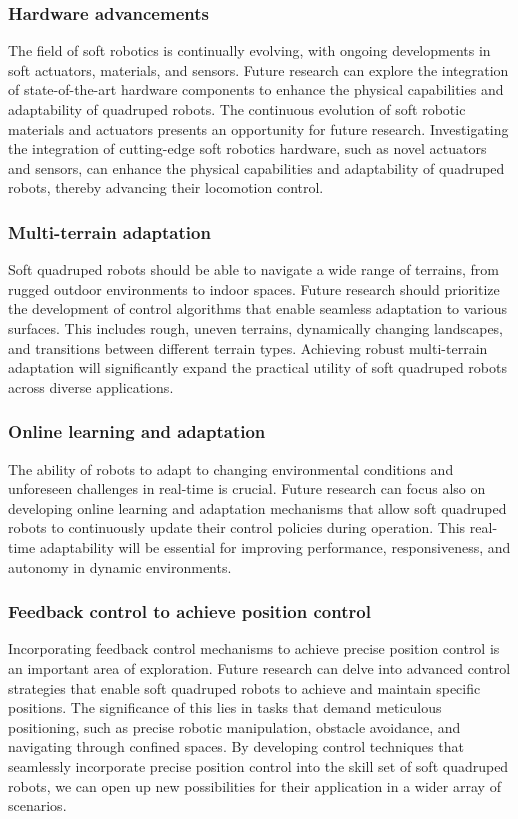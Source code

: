 \subsubsection*{Hardware advancements}
The field of soft robotics is continually evolving, with ongoing developments in soft actuators, materials, and sensors. Future research can explore the integration of state-of-the-art hardware components to enhance the physical capabilities and adaptability of quadruped robots. The continuous evolution of soft robotic materials and actuators presents an opportunity for future research. Investigating the integration of cutting-edge soft robotics hardware, such as novel actuators and sensors\cite{tan2022Shape,tan2024EdgeEnabled}, can enhance the physical capabilities and adaptability of quadruped robots, thereby advancing their locomotion control.

\subsubsection*{Multi-terrain adaptation}
Soft quadruped robots should be able to navigate a wide range of terrains, from rugged outdoor environments to indoor spaces. Future research should prioritize the development of control algorithms that enable seamless adaptation to various surfaces. This includes rough, uneven terrains, dynamically changing landscapes, and transitions between different terrain types. Achieving robust multi-terrain adaptation will significantly expand the practical utility of soft quadruped robots across diverse applications.

\subsubsection*{Online learning and adaptation}
The ability of robots to adapt to changing environmental conditions and unforeseen challenges in real-time is crucial. Future research can focus also on developing online learning and adaptation mechanisms that allow soft quadruped robots to continuously update their control policies during operation. This real-time adaptability will be essential for improving performance, responsiveness, and autonomy in dynamic environments.

\subsubsection*{Feedback control to achieve position control}
Incorporating feedback control mechanisms to achieve precise position control is an important area of exploration. Future research can delve into advanced control strategies that enable soft quadruped robots to achieve and maintain specific positions. The significance of this lies in tasks that demand meticulous positioning, such as precise robotic manipulation, obstacle avoidance, and navigating through confined spaces. By developing control techniques that seamlessly incorporate precise position control into the skill set of soft quadruped robots, we can open up new possibilities for their application in a wider array of scenarios.

